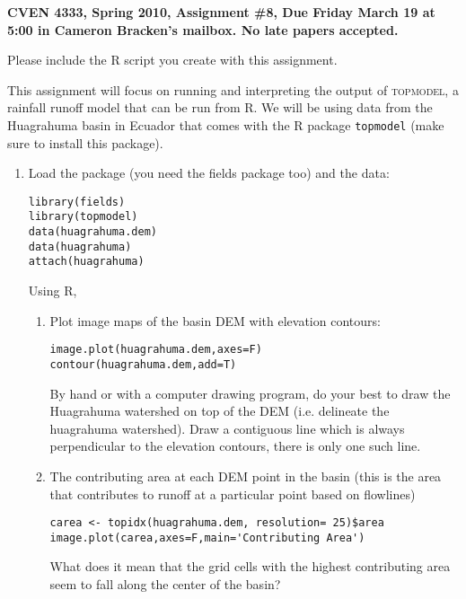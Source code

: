 \documentclass[11pt]{article}
\newcommand{\R}{\textsf{R}}
\begin{document}
\textbf{CVEN 4333, Spring 2010, Assignment \#8, Due Friday March 19 at 5:00 in Cameron Bracken's mailbox. No late papers accepted.}

Please include the \textsf{R} script you create with this assignment.

This assignment will focus on running and interpreting the output of {\scshape topmodel}, a rainfall runoff model that can be run from \R{}. We will be using data from the Huagrahuma basin in Ecuador that comes with the \R{} package \texttt{topmodel} (make sure to install this package). 


\begin{enumerate}


\item Load the package (you need the fields package too) and the data:

\begin{verbatim}
library(fields)
library(topmodel)
data(huagrahuma.dem)
data(huagrahuma)
attach(huagrahuma)
\end{verbatim}

Using \R{},
\begin{enumerate}
\item Plot image maps of the basin DEM with elevation contours:

\begin{verbatim}
image.plot(huagrahuma.dem,axes=F)
contour(huagrahuma.dem,add=T)
\end{verbatim}

By hand or with a computer drawing program, do your best to draw the Huagrahuma watershed on top of the DEM (i.e. delineate the huagrahuma watershed). Draw a contiguous line which is always perpendicular to the elevation contours, there is only one such line. 

\item The contributing area at each DEM point in the basin (this is the area that contributes to runoff at a particular point based on flowlines)

\begin{verbatim}
carea <- topidx(huagrahuma.dem, resolution= 25)$area
image.plot(carea,axes=F,main='Contributing Area')
\end{verbatim}

What does it mean that the grid cells with the highest contributing area seem to fall along the center of the basin?


\end{enumerate}
\end{enumerate}
\end{document}
